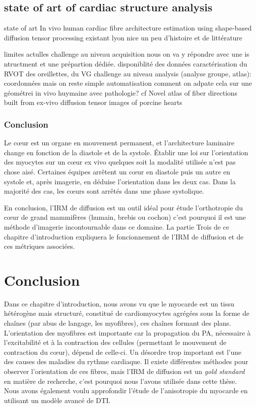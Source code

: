 \subsection{state of art of cardiac structure analysis}

state of art
In vivo human cardiac fibre architecture estimation using shape-based diffusion tensor processing
existant lyon nice
un peu d'histoire et de littérature

limites actulles
challenge au niveau acquisition nous on va y répondre avec une is ntructment et une prépartion dédiée.
disponiblité des données
caractérisation du RVOT des oreillettes, du VG 
challenge au niveau analysis (analyse groupe, atlas): coordonnées  mais on reste simple
automatisation
comment on adpate cela sur une géométrei in vivo huymaine avec pathologie?
cf Novel atlas of fiber directions built from ex-vivo diffusion tensor images of porcine hearts

\subsubsection{Conclusion}

Le cœur est un organe en mouvement permanent, et l’architecture laminaire change en fonction de la diastole et de la systole. Établir une loi sur l’orientation des myocytes sur un cœur ex vivo quelques soit la modalité utilisée n’est pas chose aisé. Certaines équipes\cite{NiellesVallespin2019} \cite{STREETER1969} arrêtent un cœur en diastole puis un autre en systole et, après imagerie, en déduise l’orientation dans les deux cas. Dans la majorité des cas, les cœurs sont arrêtés dans une phase systolique.

En conclusion, l’IRM de diffusion est un outil idéal pour étude l’orthotropie du cœur de grand mammifères (humain, brebis ou cochon) c’est pourquoi il est une méthode d’imagerie incontournable dans ce domaine. La partie Trois de ce chapitre d’introduction expliquera le foncionnement de l’IRM de diffusion et de ces métriques associées.




\section{Conclusion}

Dans ce chapitre d'introduction, nous avons vu que le myocarde est un tissu hétérogène mais structuré, constitué de cardiomyocytes agrégées sous la forme de chaînes (par abus de langage, les myofibres), ces chaînes formant des plans. L'orientation des myofibres est importante car la propagation du PA, nécessaire à l'excitabilité et à la contraction des cellules (permettant le mouvement de contraction du cœur), dépend de celle-ci. Un désordre trop important est l'une des causes des maladies du rythme cardiaque. Il existe différentes méthodes pour observer l'orientation de ces fibres, mais l'IRM de diffusion est un \textit{gold standard} en matière de recherche, c'est pourquoi nous l'avons utilisée dans cette thèse. Nous avons également voulu approfondir l'étude de l'anisotropie du myocarde en utilisant un modèle avancé de DTI.



